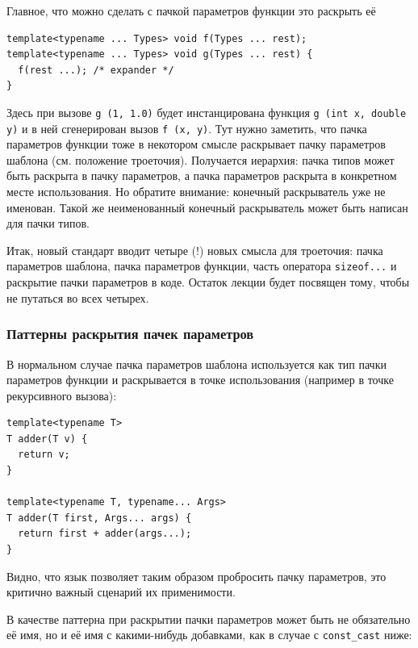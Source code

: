 \documentclass[a4paper,12pt,oneside]{article}
\newif\ifanswers
\begin{document}
\ifanswers
Правильный ответ: нет, это ошибка, их нельзя различить во время исполнения.
\fi

Главное, что можно сделать с пачкой параметров функции это раскрыть её

\begin{lstlisting}
template<typename ... Types> void f(Types ... rest);
template<typename ... Types> void g(Types ... rest) {
  f(rest ...); /* expander */
}
\end{lstlisting}

Здесь при вызове \lstinline!g (1, 1.0)! будет инстанцирована функция \lstinline!g (int x, double y)! и в ней сгенерирован вызов \lstinline!f (x, y)!. Тут нужно заметить, что пачка параметров функции тоже в некотором смысле раскрывает пачку параметров шаблона (см. положение троеточия). Получается иерархия: пачка типов может быть раскрыта в пачку параметров, а пачка параметров раскрыта в конкретном месте использования. Но обратите внимание: конечный раскрыватель уже не именован. Такой же неименованный конечный раскрыватель может быть написан для пачки типов.

Итак, новый стандарт вводит четыре (!) новых смысла для троеточия: пачка параметров шаблона, пачка параметров функции, часть оператора \lstinline!sizeof...! и раскрытие пачки параметров в коде. Остаток лекции будет посвящен тому, чтобы не путаться во всех четырех.

\subsubsection{Паттерны раскрытия пачек параметров}

В нормальном случае пачка параметров шаблона используется как тип пачки параметров функции и раскрывается в точке использования (например в точке рекурсивного вызова):

\begin{lstlisting}
template<typename T>
T adder(T v) {
  return v;
}

template<typename T, typename... Args>
T adder(T first, Args... args) {
  return first + adder(args...);
}
\end{lstlisting}

Видно, что язык позволяет таким образом пробросить пачку параметров, это критично важный сценарий их применимости.

В качестве паттерна при раскрытии пачки параметров может быть не обязательно её имя, но и её имя с какими-нибудь добавками, как в случае с \lstinline!const_cast! ниже:
\end{document}
